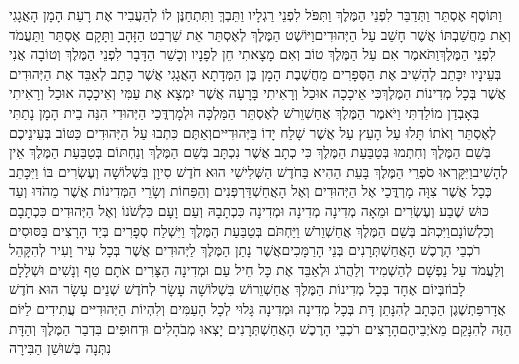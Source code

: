 \documentclass[../main/main.tex]{subfiles}
\begin{document}
\begin{multicols*}{\ncols}
וַתּוֹסֶף אֶסְתֵּר וַתְּדַבֵּר לִפְנֵי הַמֶּלֶךְ וַתִּפֹּל לִפְנֵי רַגְלָיו וַתֵּבְךְּ וַתִּתְחַנֶּן לוֹ לְהַעֲבִיר אֶת רָעַת הָמָן הָאֲגָגִי וְאֵת מַחֲשַׁבְתּוֹ אֲשֶׁר חָשַׁב עַל הַיְּהוּדִים\PreVerseSpace{}וַיּוֹשֶׁט הַמֶּלֶךְ לְאֶסְתֵּר אֵת שַׁרְבִט הַזָּהָב וַתָּקָם אֶסְתֵּר וַתַּעֲמֹד לִפְנֵי הַמֶּלֶךְ\PreVerseSpace{}וַתֹּאמֶר אִם עַל הַמֶּלֶךְ טוֹב וְאִם מָצָאתִי חֵן לְפָנָיו וְכָשֵׁר הַדָּבָר לִפְנֵי הַמֶּלֶךְ וְטוֹבָה אֲנִי בְּעֵינָיו יִכָּתֵב לְהָשִׁיב אֶת הַסְּפָרִים מַחֲשֶׁבֶת הָמָן בֶּן הַמְּדָתָא הָאֲגָגִי אֲשֶׁר כָּתַב לְאַבֵּד אֶת הַיְּהוּדִים אֲשֶׁר בְּכָל מְדִינוֹת הַמֶּלֶךְ\PreVerseSpace{}כִּי אֵיכָכָה אוּכַל וְרָאִיתִי בָּרָעָה אֲשֶׁר יִמְצָא אֶת עַמִּי וְאֵיכָכָה אוּכַל וְרָאִיתִי בְּאָבְדַן מוֹלַדְתִּי \ClosedSection{}וַיֹּאמֶר הַמֶּלֶךְ אֲחַשְׁוֵרֹשׁ לְאֶסְתֵּר הַמַּלְכָּה וּלְמָרְדֳּכַי הַיְּהוּדִי הִנֵּה בֵית הָמָן נָתַתִּי לְאֶסְתֵּר וְאֹתוֹ תָּלוּ עַל הָעֵץ עַל אֲשֶׁר שָׁלַח יָדוֹ בַּיְּהוּדִיּים\PreVerseSpace{}וְאַתֶּם כִּתְבוּ עַל הַיְּהוּדִים כַּטּוֹב בְּעֵינֵיכֶם בְּשֵׁם הַמֶּלֶךְ וְחִתְמוּ בְּטַבַּעַת הַמֶּלֶךְ כִּי כְתָב אֲשֶׁר נִכְתָּב בְּשֵׁם הַמֶּלֶךְ וְנַחְתּוֹם בְּטַבַּעַת הַמֶּלֶךְ אֵין לְהָשִׁיב\PreVerseSpace{}וַיִּקָּרְאוּ סֹפְרֵי הַמֶּלֶךְ בָּעֵת הַהִיא בַּחֹדֶשׁ הַשְּׁלִישִׁי הוּא חֹדֶשׁ סִיוָן בִּשְׁלוֹשָׁה וְעֶשְׂרִים בּוֹ וַיִּכָּתֵב כְּכָל אֲשֶׁר צִוָּה מָרְדֳּכַי אֶל הַיְּהוּדִים וְאֶל הָאֲחַשְׁדַּרְפְּנִים וְהַפַּחוֹת וְשָׂרֵי הַמְּדִינוֹת אֲשֶׁר מֵהֹדּוּ וְעַד כּוּשׁ שֶׁבַע וְעֶשְׂרִים וּמֵאָה מְדִינָה מְדִינָה וּמְדִינָה כִּכְתָבָהּ וְעַם וָעָם כִּלְשֹׁנוֹ וְאֶל הַיְּהוּדִים כִּכְתָבָם וְכִלְשׁוֹנָם\PreVerseSpace{}וַיִּכְתֹּב בְּשֵׁם הַמֶּלֶךְ אֲחַשְׁוֵרֹשׁ וַיַּחְתֹּם בְּטַבַּעַת הַמֶּלֶךְ וַיִּשְׁלַח סְפָרִים בְּיַד הָרָצִים בַּסּוּסִים רֹכְבֵי הָרֶכֶשׁ הָאֲחַשְׁתְּרָנִים בְּנֵי הָרַמָּכִים\PreVerseSpace{}אֲשֶׁר נָתַן הַמֶּלֶךְ לַיְּהוּדִים אֲשֶׁר בְּכָל עִיר וָעִיר לְהִקָּהֵל וְלַעֲמֹד עַל נַפְשָׁם לְהַשְׁמִיד וְלַהֲרֹג וּלְאַבֵּד אֶת כָּל חֵיל עַם וּמְדִינָה הַצָּרִים אֹתָם טַף וְנָשִׁים וּשְׁלָלָם לָבוֹז\PreVerseSpace{}בְּיוֹם אֶחָד בְּכָל מְדִינוֹת הַמֶּלֶךְ אֲחַשְׁוֵרוֹשׁ בִּשְׁלוֹשָׁה עָשָׂר לְחֹדֶשׁ שְׁנֵים עָשָׂר הוּא חֹדֶשׁ אֲדָר\PreVerseSpace{}פַּתְשֶׁגֶן הַכְּתָב לְהִנָּתֵן דָּת בְּכָל מְדִינָה וּמְדִינָה גָּלוּי לְכָל הָעַמִּים וְלִהְיוֹת הַיְּהוּדִיּים עֲתִידִים\SubEnd{} לַיּוֹם הַזֶּה לְהִנָּקֵם מֵאֹיְבֵיהֶם\PreVerseSpace{}הָרָצִים רֹכְבֵי הָרֶכֶשׁ הָאֲחַשְׁתְּרָנִים יָצְאוּ מְבֹהָלִים וּדְחוּפִים בִּדְבַר הַמֶּלֶךְ וְהַדָּת נִתְּנָה בְּשׁוּשַׁן הַבִּירָה\OpenSection{}\par

\end{multicols*}
\end{document}
